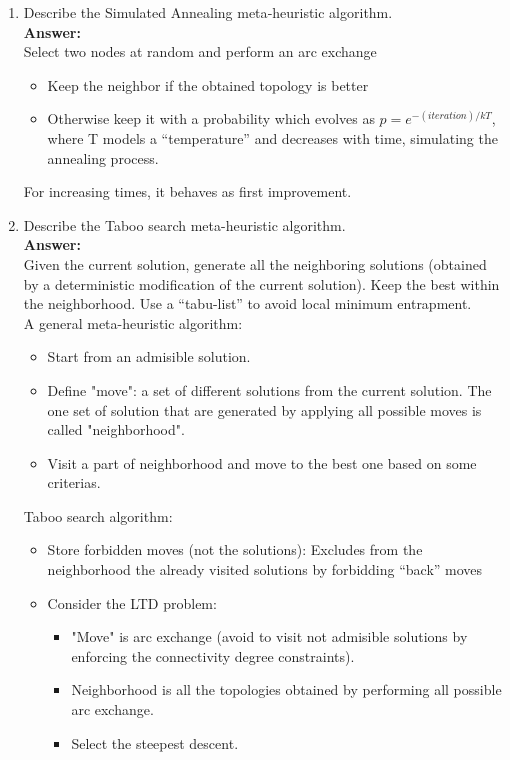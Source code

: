 \documentclass[a4paper]{article}
\begin{document}
\begin{enumerate}
\item Describe the Simulated Annealing meta­‐heuristic algorithm.\\
\textbf{Answer:}\\
Select two nodes at random and perform an arc exchange
\begin{itemize}
	\item  Keep the neighbor if the obtained topology is better
	\item Otherwise keep it with a probability which evolves as $p = e^{-(iteration)/kT}$, where T models a “temperature” and decreases with time, simulating the annealing process.
\end{itemize}
For increasing times, it behaves as first improvement.

\item Describe the Taboo search meta-­heuristic algorithm.\\
\textbf{Answer:}\\
Given the current solution, generate all the neighboring solutions (obtained by a deterministic modification of the current solution). Keep the best within the neighborhood. Use a “tabu-list” to avoid local minimum entrapment.\\
A general meta-heuristic algorithm:
\begin{itemize}
	\item Start from an admisible solution.
	\item Define "move": a set of different solutions from the current solution. The one set of solution that are generated by applying all possible moves is called "neighborhood".
	\item Visit a part of neighborhood and move to the best one based on some criterias.
\end{itemize}
Taboo search algorithm: 
\begin{itemize}
	\item Store forbidden moves (not the solutions): Excludes from the neighborhood the already visited solutions by forbidding “back” moves
	\item Consider the LTD problem: 
	\begin{itemize}
		\item "Move" is arc exchange (avoid to visit not admisible solutions by enforcing the connectivity degree constraints). 
		\item Neighborhood is all the topologies obtained by performing all possible arc exchange.
		\item Select the steepest descent. 
	\end{itemize}
\end{itemize}


\end{enumerate}
\end{document}
